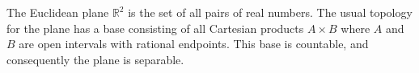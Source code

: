 The Euclidean plane $\mathbb{R}^2$ is the set of all pairs of real numbers. The usual topology for the plane has a base consisting of all Cartesian products $A \times B$ where $A$ and $B$ are open intervals with rational endpoints. This base is countable, and consequently the plane is separable.
